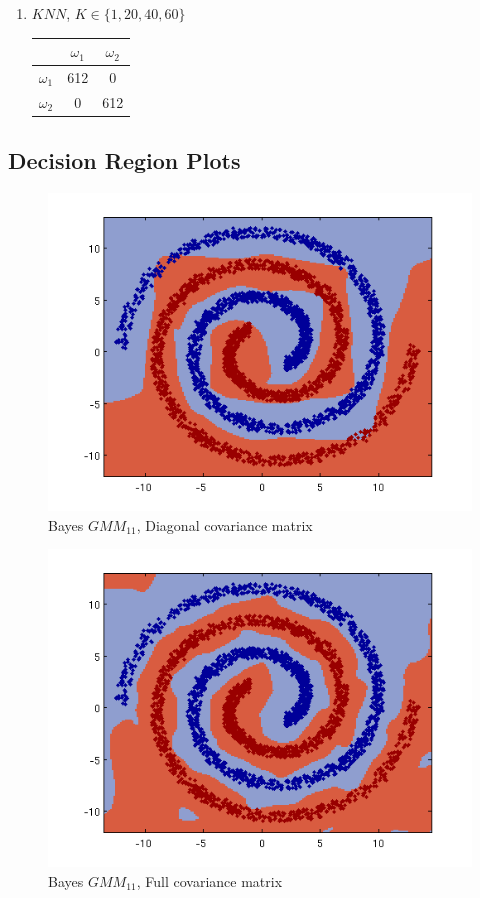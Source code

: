 \documentclass[a4paper]{article}
\begin{document}
\begin{multicols}{2}
\begin{enumerate}
\item $KNN$, $K \in \{1,20,40,60\}$

\begin{tabular}{ | l | c | c | }
\hline
& $\omega_1$ & $\omega_2$ \\
\hline
  $\omega_1$ & 612 & 0 \\
\hline
  $\omega_2$ & 0 & 612 \\
\hline
\end{tabular}

\end{enumerate}
\end{multicols}


\newpage
\subsection{Decision Region Plots}

\begin{figure}[htbp!]
\center
\includegraphics[clip, trim=40px 15px 30px 10px]{gmm_nls_diagcov.png}
\caption{Bayes $GMM_{11}$, Diagonal covariance matrix}
\end{figure}

\begin{figure}[htbp!]
\center
\includegraphics[clip, trim=40px 15px 30px 10px]{gmm_nls_fullcov.png}
\caption{Bayes $GMM_{11}$, Full covariance matrix}
\end{figure}
\end{document}
